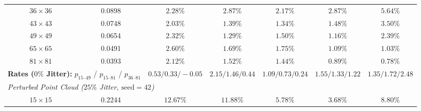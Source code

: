 \documentclass[VANCOUVER]{USG}
\begin{document}
\begin{table}[!t]
{\begin{tabular}{ccccccc}
            $36 \times 36$                                                                                    & 0.0898                                       & $2.28\%$                               & $2.87\%$                        & $2.17\%$                               & $2.87\%$                               & $5.64\%$                               \\
            $43 \times 43$                                                                                    & 0.0748                                       & $2.03\%$                               & $1.39\%$                        & $1.34\%$                               & $1.48\%$                               & $3.50\%$                               \\
            $49 \times 49$                                                                                    & 0.0654                                       & $2.32\%$                               & $1.29\%$                        & $1.50\%$                               & $\mathbf{1.16\%}$                      & $2.39\%$                               \\
            $65 \times 65$                                                                                    & 0.0491                                       & $2.60\%$                               & $1.69\%$                        & $1.75\%$                               & $1.09\%$                               & $\mathbf{1.03\%}$                      \\
            $81 \times 81$                                                                                    & 0.0393                                       & $2.12\%$                               & $1.52\%$                        & $1.44\%$                               & $0.89\%$                               & $\mathbf{0.78\%}$                      \\
            \midrule
            \multicolumn{2}{l}{\textbf{Rates ($0\%$ Jitter):} $p_{15\text{--}49}$ / $p_{15\text{--}81}$ / $p_{36\text{--}81}$} & $0.53 / 0.33 / -0.05$                  & $2.15 / 1.46 / 0.44$            & $1.09 / 0.73 / 0.24$                   & $1.55 / 1.33 / 1.22$                   & $1.35 / \mathbf{1.72} / \mathbf{2.48}$ \\
            \midrule
            \multicolumn{7}{l}{\textit{Perturbed Point Cloud ($25\%$ Jitter, $\text{seed}=42$)}} \\
            $15 \times 15$                                                                                    & 0.2244                                       & $12.67\%$                              & $11.88\%$                       & $5.78\%$                               & $\mathbf{3.68\%}$                      & $8.80\%$                               \\

\end{tabular}}
\end{table}
\end{document}
